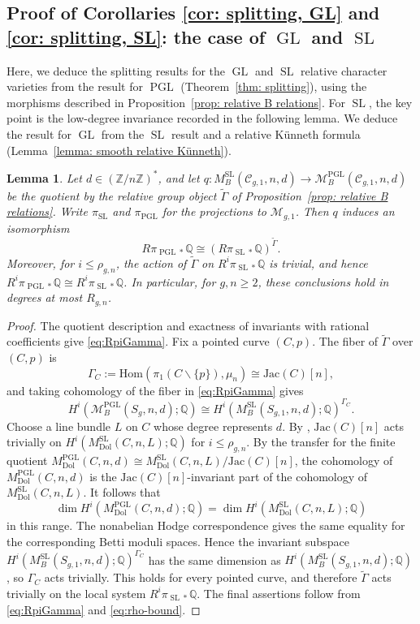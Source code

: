 \documentclass[11pt,reqno]{amsart}
\theoremstyle{plain} %
\newtheorem{lemma}[theorem]{Lemma}
\theoremstyle{definition}
\newcommand{\QQ}{\mathbb{Q}}
\newcommand{\Hom}{\mathrm{Hom}}
\newcommand{\M}{\mathcal{M}}
\newcommand{\C}{\mathcal{C}}
\newcommand{\ZZ}{\mathbb{Z}}
\DeclareMathOperator{\GL}{GL}
\DeclareMathOperator{\SL}{SL}
\DeclareMathOperator{\PGL}{PGL}
\newcommand{\Dol}{\mathrm{Dol}}
\newcommand{\Jac}{\mathrm{Jac}}
\begin{document}
\subsection{Proof of Corollaries \ref{cor: splitting, GL} and \ref{cor: splitting, SL}: the case of \texorpdfstring{$\GL$}{GL} and \texorpdfstring{$\SL$}{SL}} \label{subsec: PGL B to GL/SL}
Here, we deduce the splitting results for the $\GL$ and $\SL$ relative character varieties from the result for $\PGL$ (Theorem~\ref{thm: splitting}), using the morphisms described in Proposition~\ref{prop: relative B relations}. For $\SL$, the key point is the low-degree invariance recorded in the following lemma. We deduce the result for $\GL$ from the $\SL$ result and a relative Künneth formula (Lemma~\ref{lemma: smooth relative Künneth}).

\begin{lemma}\label{lemma: SL invariance}
Let $d\in(\ZZ/n\ZZ)^*$, and let $q\colon M_B^{\SL}(\C_{g,1},n,d)\longrightarrow\M_B^{\PGL}(\C_{g,1},n,d)$  be the quotient by the relative group object $\widetilde\Gamma$ of Proposition~\ref{prop: relative B relations}. Write $\pi_{\SL}$ and $\pi_{\PGL}$ for the projections to $\M_{g,1}$. Then $q$ induces an isomorphism
\begin{equation}\label{eq:RpiGamma}
R\pi_{\PGL *}\QQ \cong (R\pi_{\SL *}\QQ)^{\widetilde\Gamma}.
\end{equation}
Moreover, for $i \le \rho_{g,n}$, the action of $\widetilde\Gamma$ on $R^i\pi_{\SL *}\QQ$ is trivial, and hence
$R^i\pi_{\PGL *}\QQ \cong R^i\pi_{\SL *}\QQ$. In particular, for $g,n\geq 2$, these conclusions hold in degrees at most $R_{g,n}$.
\end{lemma}

\begin{proof}
The quotient description and exactness of invariants with rational coefficients give \eqref{eq:RpiGamma}. Fix a pointed curve $(C,p)$. The fiber of $\widetilde\Gamma$ over $(C,p)$ is
\[
\Gamma_C := \Hom(\pi_1(C \smallsetminus \{p\}),\mu_n) \cong \Jac(C)[n],
\]
and taking cohomology of the fiber in \eqref{eq:RpiGamma} gives
\[
H^i(\M_B^{\PGL}(S_g,n,d);\QQ) \cong H^i(M_B^{\SL}(S_{g,1},n,d);\QQ)^{\Gamma_C}.
\]
Choose a line bundle $L$ on $C$ whose degree represents $d$. By \cite[Theorem~1.4]{Hausel-Pauly}, $\Jac(C)[n]$ acts trivially on $H^i(M_{\Dol}^{\SL}(C,n,L);\QQ)$ for $i \le \rho_{g,n}$. By the transfer for the finite quotient $M_{\Dol}^{\PGL}(C,n,d) \cong M_{\Dol}^{\SL}(C,n,L)/\Jac(C)[n]$, the cohomology of $M_{\Dol}^{\PGL}(C,n,d)$ is the $\Jac(C)[n]$-invariant part of the cohomology of $M_{\Dol}^{\SL}(C,n,L)$. It follows that
\[
\dim H^i(M_{\Dol}^{\PGL}(C,n,d);\QQ) = \dim H^i(M_{\Dol}^{\SL}(C,n,L);\QQ)
\]
in this range. The nonabelian Hodge correspondence gives the same equality for the corresponding Betti moduli spaces. Hence the invariant subspace $H^i(M_B^{\SL}(S_{g,1},n,d);\QQ)^{\Gamma_C}$ has the same dimension as $H^i(M_B^{\SL}(S_{g,1},n,d);\QQ)$, so $\Gamma_C$ acts trivially. This holds for every pointed curve, and therefore $\widetilde\Gamma$ acts trivially on the local system $R^i\pi_{\SL *}\QQ$. The final assertions follow from \eqref{eq:RpiGamma} and \eqref{eq:rho-bound}.
\end{proof}
\end{document}
